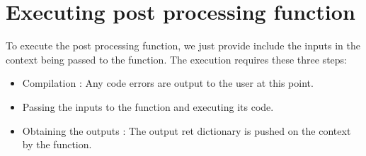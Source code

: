 \documentclass[letterpaper,10pt,english]{sphinxmanual}
\begin{document}
%
\begin{sphinxVerbatim}[commandchars=\\\{\}]
 
      \PYG{p}{[}\PYG{p}{]} \PYG{p}{[}\PYG{p}{]}
     \PYG{p}{[}\PYG{p}{]} 
      \PYG{p}{[}\PYG{p}{]}
      \PYG{p}{[}\PYG{p}{]}
       
        \PYG{p}{[}\PYG{p}{]}\PYG{p}{[}\PYG{p}{]}
        \PYG{p}{[}\PYG{p}{]}\PYG{p}{[}\PYG{p}{]}

      
    \PYG{p}{[}\PYG{p}{]}  
    \PYG{p}{[}\PYG{p}{]}  
     
\end{sphinxVerbatim}


\section{Executing post processing function}
\label{\detokenize{postprocessing:executing-post-processing-function}}
To execute the post processing function, we just provide include the inputs in the context being passed to the function. The execution requires these three steps:
\begin{itemize}
\item {} 
Compilation : Any code errors are output to the user at this point.

\item {} 
Passing the inputs to the function and executing its code.

\item {} 
Obtaining the outputs : The output ret dictionary is pushed on the context by the function.

\end{itemize}
\end{document}
